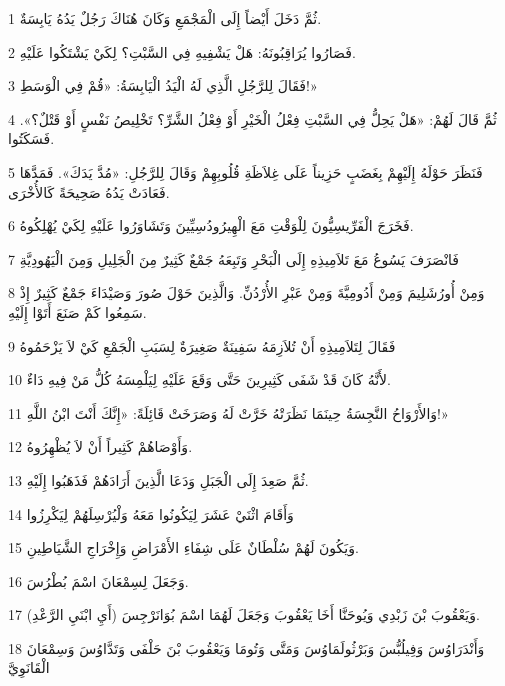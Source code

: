 \par 1 ثُمَّ دَخَلَ أَيْضاً إِلَى الْمَجْمَعِ وَكَانَ هُنَاكَ رَجُلٌ يَدُهُ يَابِسَةٌ.
\par 2 فَصَارُوا يُرَاقِبُونَهُ: هَلْ يَشْفِيهِ فِي السَّبْتِ؟ لِكَيْ يَشْتَكُوا عَلَيْهِ.
\par 3 فَقَالَ لِلرَّجُلِ الَّذِي لَهُ الْيَدُ الْيَابِسَةُ: «قُمْ فِي الْوَسَطِ!»
\par 4 ثُمَّ قَالَ لَهُمْ: «هَلْ يَحِلُّ فِي السَّبْتِ فِعْلُ الْخَيْرِ أَوْ فِعْلُ الشَّرِّ؟ تَخْلِيصُ نَفْسٍ أَوْ قَتْلٌ؟». فَسَكَتُوا.
\par 5 فَنَظَرَ حَوْلَهُ إِلَيْهِمْ بِغَضَبٍ حَزِيناً عَلَى غِلاَظَةِ قُلُوبِهِمْ وَقَالَ لِلرَّجُلِ: «مُدَّ يَدَكَ». فَمَدَّهَا فَعَادَتْ يَدُهُ صَحِيحَةً كَالأُخْرَى.
\par 6 فَخَرَجَ الْفَرِّيسِيُّونَ لِلْوَقْتِ مَعَ الْهِيرُودُسِيِّينَ وَتَشَاوَرُوا عَلَيْهِ لِكَيْ يُهْلِكُوهُ.
\par 7 فَانْصَرَفَ يَسُوعُ مَعَ تَلاَمِيذِهِ إِلَى الْبَحْرِ وَتَبِعَهُ جَمْعٌ كَثِيرٌ مِنَ الْجَلِيلِ وَمِنَ الْيَهُودِيَّةِ
\par 8 وَمِنْ أُورُشَلِيمَ وَمِنْ أَدُومِيَّةَ وَمِنْ عَبْرِ الأُرْدُنِّ. وَالَّذِينَ حَوْلَ صُورَ وَصَيْدَاءَ جَمْعٌ كَثِيرٌ إِذْ سَمِعُوا كَمْ صَنَعَ أَتَوْا إِلَيْهِ.
\par 9 فَقَالَ لِتَلاَمِيذِهِ أَنْ تُلاَزِمَهُ سَفِينَةٌ صَغِيرَةٌ لِسَبَبِ الْجَمْعِ كَيْ لاَ يَزْحَمُوهُ
\par 10 لأَنَّهُ كَانَ قَدْ شَفَى كَثِيرِينَ حَتَّى وَقَعَ عَلَيْهِ لِيَلْمِسَهُ كُلُّ مَنْ فِيهِ دَاءٌ.
\par 11 وَالأَرْوَاحُ النَّجِسَةُ حِينَمَا نَظَرَتْهُ خَرَّتْ لَهُ وَصَرَخَتْ قَائِلَةً: «إِنَّكَ أَنْتَ ابْنُ اللَّهِ!»
\par 12 وَأَوْصَاهُمْ كَثِيراً أَنْ لاَ يُظْهِرُوهُ.
\par 13 ثُمَّ صَعِدَ إِلَى الْجَبَلِ وَدَعَا الَّذِينَ أَرَادَهُمْ فَذَهَبُوا إِلَيْهِ.
\par 14 وَأَقَامَ اثْنَيْ عَشَرَ لِيَكُونُوا مَعَهُ وَلْيُرْسِلَهُمْ لِيَكْرِزُوا
\par 15 وَيَكُونَ لَهُمْ سُلْطَانٌ عَلَى شِفَاءِ الأَمْرَاضِ وَإِخْرَاجِ الشَّيَاطِينِ.
\par 16 وَجَعَلَ لِسِمْعَانَ اسْمَ بُطْرُسَ.
\par 17 وَيَعْقُوبَ بْنَ زَبْدِي وَيُوحَنَّا أَخَا يَعْقُوبَ وَجَعَلَ لَهُمَا اسْمَ بُوَانَرْجِسَ (أَيِ ابْنَيِ الرَّعْدِ).
\par 18 وَأَنْدَرَاوُسَ وَفِيلُبُّسَ وَبَرْثُولَمَاوُسَ وَمَتَّى وَتُومَا وَيَعْقُوبَ بْنَ حَلْفَى وَتَدَّاوُسَ وَسِمْعَانَ الْقَانَوِيَّ
